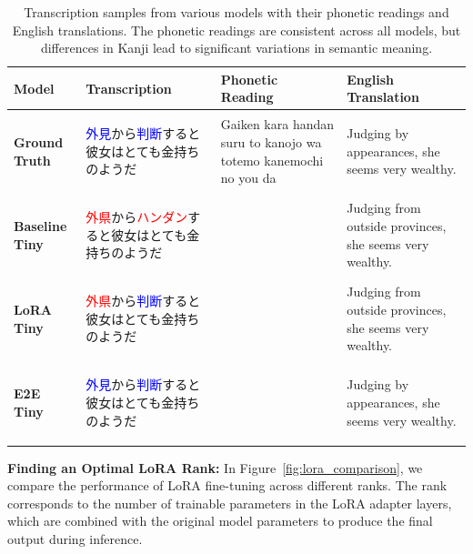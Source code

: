 \documentclass[10pt,twocolumn,letterpaper]{article}
\begin{document}
\begin{table}[ht]
    \centering
    \renewcommand{\arraystretch}{1.2}
    \begin{tabular}{p{2cm}p{4cm}p{4cm}p{4cm}}
        \hline
        \textbf{Model} & \textbf{Transcription} & \textbf{Phonetic Reading} & \textbf{English Translation} \\
        \hline
        \textbf{Ground Truth} & 
        \begin{CJK}{UTF8}{min}\textcolor{blue}{外見}から\textcolor{blue}{判断}すると彼女はとても金持ちのようだ\end{CJK} & 
        Gaiken kara handan suru to kanojo wa totemo kanemochi no you da & 
        Judging by appearances, she seems very wealthy. \\
        
        \textbf{Baseline Tiny} & 
        \begin{CJK}{UTF8}{min}\textcolor{red}{外県}から\textcolor{red}{ハンダン}すると彼女はとても金持ちのようだ\end{CJK} & 
        & Judging from outside provinces, she seems very wealthy. \\
        
        \textbf{LoRA Tiny} & 
        \begin{CJK}{UTF8}{min}\textcolor{red}{外県}から\textcolor{blue}{判断}すると彼女はとても金持ちのようだ\end{CJK} & 
        & Judging from outside provinces, she seems very wealthy. \\
        
        \textbf{E2E Tiny} & 
        \begin{CJK}{UTF8}{min}\textcolor{blue}{外見}から\textcolor{blue}{判断}すると彼女はとても金持ちのようだ\end{CJK} & 
        & Judging by appearances, she seems very wealthy. \\
        \hline
    \end{tabular}
    \caption{Transcription samples from various models with their phonetic readings and English translations. The phonetic readings are consistent across all models, but differences in Kanji lead to significant variations in semantic meaning.}
    \label{tab:transcription_comparison}
\end{table}

\textbf{Finding an Optimal LoRA Rank:}
In Figure~\ref{fig:lora_comparison}, we compare the performance of LoRA fine-tuning across different ranks. The rank corresponds to the number of trainable parameters in the LoRA adapter layers, which are combined with the original model parameters to produce the final output during inference.
\end{document}
